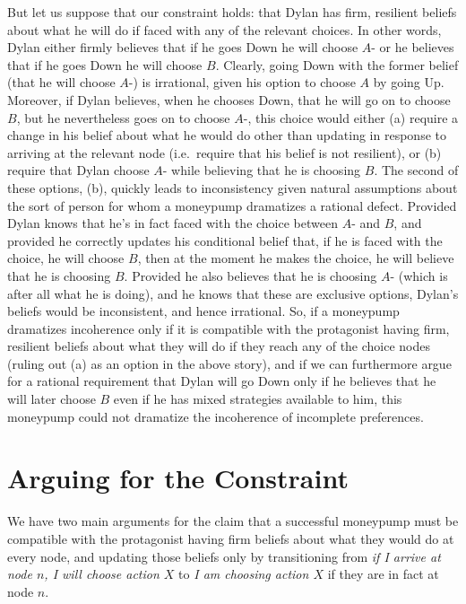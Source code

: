 \documentclass[
  11pt,
  letterpaper,
  DIV=11,
  numbers=noendperiod,
  twoside]{scrartcl}
\begin{document}
But let us suppose that our constraint holds: that Dylan has firm,
resilient beliefs about what he will do if faced with any of the
relevant choices. In other words, Dylan either firmly believes that if
he goes Down he will choose \(A\)- or he believes that if he goes Down
he will choose \(B\). Clearly, going Down with the former belief (that
he will choose \(A\)-) is irrational, given his option to choose \(A\)
by going Up. Moreover, if Dylan believes, when he chooses Down, that he
will go on to choose \(B\), but he nevertheless goes on to choose
\(A\)-, this choice would either (a) require a change in his belief
about what he would do other than updating in response to arriving at
the relevant node (i.e.~require that his belief is not resilient), or
(b) require that Dylan choose \(A\)- while believing that he is choosing
\(B\). The second of these options, (b), quickly leads to inconsistency
given natural assumptions about the sort of person for whom a moneypump
dramatizes a rational defect. Provided Dylan knows that he's in fact
faced with the choice between \(A\)- and \(B\), and provided he
correctly updates his conditional belief that, if he is faced with the
choice, he will choose \(B\), then at the moment he makes the choice, he
will believe that he is choosing \(B\). Provided he also believes that
he is choosing \(A\)- (which is after all what he is doing), and he
knows that these are exclusive options, Dylan's beliefs would be
inconsistent, and hence irrational. So, if a moneypump dramatizes
incoherence only if it is compatible with the protagonist having firm,
resilient beliefs about what they will do if they reach any of the
choice nodes (ruling out (a) as an option in the above story), and if we
can furthermore argue for a rational requirement that Dylan will go Down
only if he believes that he will later choose \(B\) even if he has mixed
strategies available to him, this moneypump could not dramatize the
incoherence of incomplete preferences.

\section{Arguing for the Constraint}\label{arguing-for-the-constraint}

We have two main arguments for the claim that a successful moneypump
must be compatible with the protagonist having firm beliefs about what
they would do at every node, and updating those beliefs only by
transitioning from \emph{if I arrive at node \(n\), I will choose action
\(X\)} to \emph{I am choosing action \(X\)} if they are in fact at node
\(n\).
\end{document}
